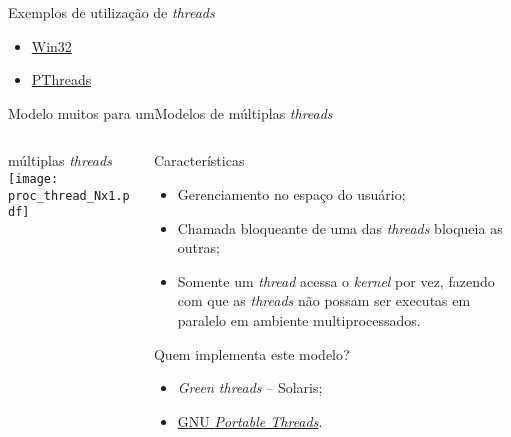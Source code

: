 \begin{frame}{Exemplos de utilização de {\em threads}}

  \begin{itemize}
  \item \href{http://adrianoholanda.org/edu/os/proc/proc_thread_win32.c}{Win32}
  \item \href{http://adrianoholanda.org/edu/os/proc/proc_thread_posix.c}{PThreads}
  \end{itemize}
  
\end{frame}





\begin{frame}{Modelo muitos para um}{Modelos de múltiplas {\em threads}}
  \begin{columns}
    \begin{column}{0.4\textwidth}
      \begin{block}{múltiplas \em threads}
        \texttt{[image: proc\_thread\_Nx1.pdf]}
      \end{block}
    \end{column}
    \begin{column}{0.6\textwidth}
      \begin{block}{Características}
        \begin{itemize}
        \item Gerenciamento no espaço do usuário;
        \item Chamada bloqueante de uma das {\em threads} bloqueia as outras;
        \item Somente um {\em thread} acessa o {\em kernel} por vez,
          fazendo com que as {\em threads} não possam ser executas em
          paralelo em ambiente multiprocessados. 
        \end{itemize}
      \end{block}
      \begin{block}{Quem implementa este modelo?}
        \begin{itemize}
        \item {\em Green threads} -- Solaris;
        \item \href{http://www.gnu.org/software/pth/}{GNU \em Portable Threads}.
        \end{itemize}
      \end{block}
    \end{column}
  \end{columns}
\end{frame}


